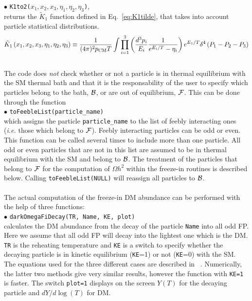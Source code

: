 \documentclass[12pt,a4paper]{article}
\begin{document}
\noindent$\bullet$ \verb|K1to2(|$x_1,x_2,x_3,\eta_1,\eta_2,\eta_3$\verb|)|,\\
 returns the $\tilde{K}_1$ function defined in Eq.~\eqref{eq:K1tilde}, that takes into account particle statistical distributions.  
 \begin{equation}\label{eq:K1tilde}
\tilde K_1 \left( x_1, x_2, x_3, \eta_1, \eta_2, \eta_3 \right)  \equiv
\frac{1}{(4\pi)^2 p_{\rm CM} T} \int \prod\limits_{i=1}^{3} \left( \frac{d^3 p_i}{E_i} \frac{1}{e^{E_i/T} - \eta_i} \right) e^{E_1/T} \delta^4 \left( P_1 - P_2 - P_3 \right) 
\end{equation}
\\
The code does \textit{not} check whether or not a particle is in thermal equilibrium with the SM thermal bath and that it is the responsability of the user to specify which particles belong to the bath, ${\cal B}$, or are out of equilibrium, ${\cal F}$. This can be done through the function\\
\noindent
$\bullet$ \verb|toFeebleList(particle_name)|\\
which assigns the particle \verb|particle_name| to the list of feebly interacting ones (\textit{i.e.} those which belong to ${\cal F}$). Feebly interacting particles can be odd or even.   
This function can be called several times to include more than one particle.  All  odd or even particles that are not in this list are assumed to be in thermal equilibrium with the SM and belong to ${\cal B}$. 
The treatment of the particles that belong to  ${\cal F}$ for the computation of $\Omega h^2$ within the freeze-in routines is described below. 
Calling \verb|toFeebleList(NULL)| will reassign all particles to ${\cal B}$.
\\
\\


The actual computation of the freeze-in DM abundance can be performed with the help of three functions:\\
\noindent
$\bullet$ \verb|darkOmegaFiDecay(TR, Name, KE, plot) | \\
calculates the  DM abundance from the  decay of the particle \verb|Name| into all odd FP. Here we assume that all odd FP will decay into the lightest one which is the DM. \verb|TR| is the  reheating temperature and \verb|KE| is a switch to specify whether the decaying particle is in kinetic equilibrium (\verb|KE|=1) or not (\verb|KE|=0) with the SM.
The equations used for the three different cases are described in ~\cite{Belanger:2018ccd}.
 Numerically, the latter two methods give very similar results, however the function with \verb|KE=1| is faster. The switch \verb|plot=1| displays on the screen  $Y(T)$ for the decaying particle and $dY/d\log(T)$ for DM.\\
\end{document}
